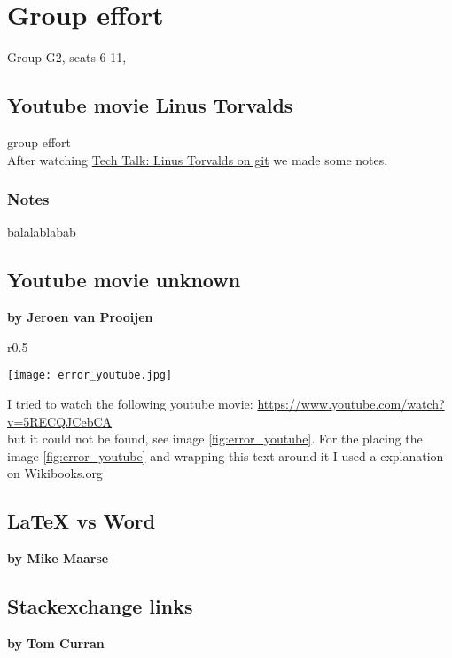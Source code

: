 \chapter{Group effort}

Group G2, seats 6-11,

\section{Youtube movie Linus Torvalds}
group effort\\
After watching \href{https://www.youtube.com/watch?v=4XpnKHJAok8}{Tech Talk: Linus Torvalds on git} we made some notes.

\subsection{Notes}
balalablabab


\section{Youtube movie unknown}
\textbf{by Jeroen van Prooijen}\\

\begin{wrapfigure}{r}{0.5\textwidth}
 \vspace{-20pt}
 \begin{center}
  \texttt{[image: error\_youtube.jpg]}
 \end{center}
 \vspace{-20pt}
 \caption{screenshot}
 \vspace{-10pt}
\label{fig:error_youtube}
\end{wrapfigure}

I tried to watch the following youtube movie: \url{https://www.youtube.com/watch?v=5RECQJCebCA}\\
but it could not be found, see image \ref{fig:error_youtube}. For the placing the image \ref{fig:error_youtube} and wrapping this
text around it I used a explanation on Wikibooks.org\cite{wikibooks_figures}

\newpage

\section{LaTeX vs Word}
\textbf{by Mike Maarse}\\

\section{Stackexchange links}
\textbf{by Tom Curran}\\

